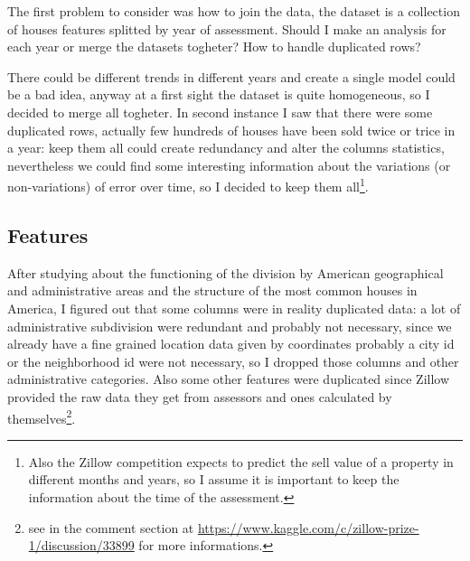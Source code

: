 The first problem to consider was how to join the data, the dataset is a collection of houses features splitted by year of assessment. Should I make an analysis for each year or merge the datasets togheter? How to handle duplicated rows?
    
There could be different trends in different years and create a single model could be a bad idea, anyway at a first sight the dataset is quite homogeneous, so I decided to merge all togheter. In second instance I saw that there were some duplicated rows, actually few hundreds of houses have been sold twice or trice in a year: keep them all could create redundancy and alter the columns statistics, nevertheless we could find some interesting information about the variations (or non-variations) of error over time, so I decided to keep them all\footnote{
    Also the Zillow competition expects to predict the sell value of a property in different months and years, so I assume it is important to keep the information about the time of the assessment.
    }.

\subsection{Features}

After studying about the functioning of the division by American geographical and administrative areas and the structure of the most common houses in America, I figured out that some columns were in reality duplicated data: a lot of administrative subdivision were redundant and probably not necessary, since we already have a fine grained location data given by coordinates probably a city id or the neighborhood id were not necessary, so I dropped those columns and other administrative categories. Also some other features were duplicated since Zillow provided the raw data they get from assessors and ones calculated by themselves\footnote{see in the comment section at \url{https://www.kaggle.com/c/zillow-prize-1/discussion/33899} for more informations.}.

